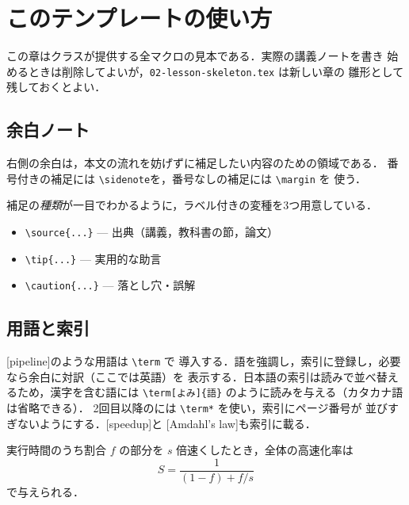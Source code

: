 \documentclass[../main.tex]{subfiles}
\begin{document}
\chapter{このテンプレートの使い方}

この章はクラスが提供する全マクロの見本である．実際の講義ノートを書き
始めるときは削除してよいが，\texttt{02-lesson-skeleton.tex} は新しい章の
雛形として残しておくとよい．

\section{余白ノート}

右側の余白は，本文の流れを妨げずに補足したい内容のための領域である．
番号付きの補足には \verb|\sidenote|を，番号なしの補足には \verb|\margin| を
使う．

補足の\emph{種類}が一目でわかるように，ラベル付きの変種を3つ用意している．
\begin{itemize}
  \item \verb|\source{...}| --- 出典（講義，教科書の節，論文）
  \item \verb|\tip{...}| --- 実用的な助言
  \item \verb|\caution{...}| --- 落とし穴・誤解
\end{itemize}

\section{用語と索引}

[pipeline]のような用語は \verb|\term| で
導入する．語を強調し，索引に登録し，必要なら余白に対訳（ここでは英語）を
表示する．日本語の索引は読みで並べ替えるため，漢字を含む語には
\verb|\term[よみ]{語}| のように読みを与える（カタカナ語は省略できる）．
2回目以降のには \verb|\term*| を使い，索引にページ番号が
並びすぎないようにする．[speedup]と
[Amdahl's law]も索引に載る．

\begin{definition}[高速化率]
  実行時間のうち割合 $f$ の部分を $s$ 倍速くしたとき，全体の高速化率は
  \begin{equation}
    S = \frac{1}{(1-f) + f/s}
    \label{eq:amdahl}
  \end{equation}
  で与えられる．
\end{definition}
\end{document}
